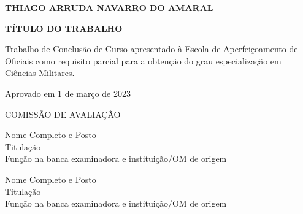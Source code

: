 \documentclass[12pt,a4paper]{article}
\begin{document}
\newpage %

\begin{titlepage}
    \centering
    \doublespacing

    \vspace*{3cm} %

    \textbf{THIAGO ARRUDA NAVARRO DO AMARAL} %

    \vspace*{2\baselineskip} %

    \textbf{TÍTULO DO TRABALHO} %
    
    \vspace*{\baselineskip} %


    \vspace*{\baselineskip} %

    \begin{flushright}
    \begin{minipage}{0.5\textwidth}
    
        \singlespacing
        Trabalho de Conclusão de Curso apresentado à Escola de  Aperfeiçoamento de Oficiais como requisito parcial para a obtenção do grau especialização em Ciências Militares.
    \end{minipage}
    \end{flushright}
    \doublespacing

    \vspace*{2\baselineskip} %

    \begin{flushleft}
        Aprovado em 1 de março de 2023 %
    \end{flushleft}

    \vspace*{2\baselineskip} %

    COMISSÃO DE AVALIAÇÃO

    \begin{center}
        \makebox[10cm]{\hrulefill}
        \vspace{-0.5cm}
        \singlespacing
        Nome Completo e Posto \\
        Titulação \\
        Função na banca examinadora e instituição/OM de origem %
        
        \vspace{4\baselineskip}
        
        \makebox[10cm]{\hrulefill}
        \vspace{-0.5cm}
        \singlespacing
        Nome Completo e Posto \\
        Titulação \\
        Função na banca examinadora e instituição/OM de origem %
        \vspace{2\baselineskip}
    \end{center}
\end{titlepage}
\end{document}
